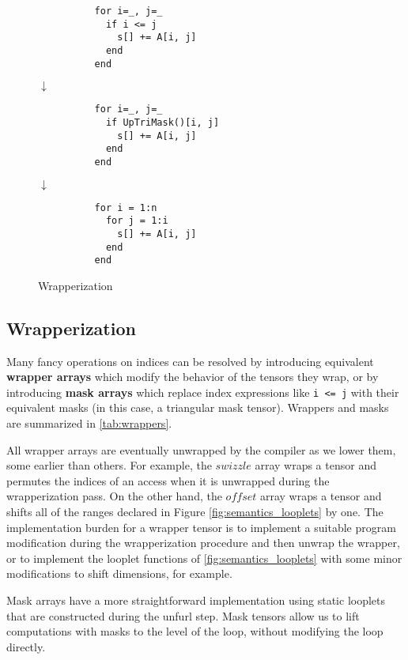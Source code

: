     \begin{wrapfigure}{R}{0.17\textwidth}
        \vspace{-28pt}
        \begin{verbatim}
          for i=_, j=_
            if i <= j
              s[] += A[i, j]
            end
          end
        \end{verbatim}
        $\downarrow$
        \begin{verbatim}
          for i=_, j=_
            if UpTriMask()[i, j]
              s[] += A[i, j]
            end
          end
        \end{verbatim}
        $\downarrow$
        \begin{verbatim}
          for i = 1:n
            for j = 1:i
              s[] += A[i, j]
            end
          end
        \end{verbatim}
        \caption{Wrapperization}\label{fig:wrapperization}
    \end{wrapfigure}
\subsection{Wrapperization}

    Many fancy operations on indices can be resolved by introducing equivalent
    \textbf{wrapper arrays} which modify the behavior of the tensors they wrap,
    or by introducing \textbf{mask arrays} which replace index expressions like
    \texttt{i <= j} with their equivalent masks (in this case, a
    triangular mask tensor).  Wrappers and masks are summarized in \ref{tab:wrappers}.

    All wrapper arrays are eventually unwrapped by the compiler as we lower
    them, some earlier than others. For example, the $swizzle$ array wraps a
    tensor and permutes the indices of an access when it is unwrapped during the
    wrapperization pass. On the other hand, the $offset$ array wraps a tensor
    and shifts all of the ranges declared in Figure \ref{fig:semantics_looplets} by one.
    The implementation burden for a wrapper tensor is to implement a suitable
    program modification during the wrapperization procedure and then unwrap the wrapper, or to 
    implement the looplet functions of \ref{fig:semantics_looplets} with some minor modifications
    to shift dimensions, for example.

    Mask arrays have a more straightforward implementation using static looplets
    that are constructed during the unfurl step. Mask tensors
    allow us to lift computations with masks to the level of the loop, without modifying the loop directly.

